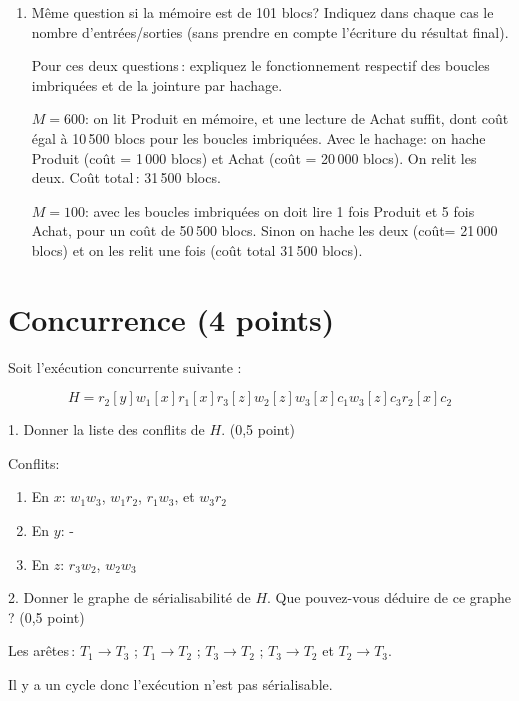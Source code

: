 \begin{enumerate}
    
   \item Même question si la mémoire est
        de 101 blocs? Indiquez dans chaque cas le nombre
    d'entrées/sorties (sans prendre en compte l'écriture du résultat final).

    Pour ces deux questions\,: expliquez le fonctionnement respectif 
    des boucles imbriquées et de la jointure par hachage.
    
\begin{solution}
$M=600$: on lit Produit en mémoire, et une lecture de Achat suffit,
dont coût égal à 10\,500 blocs pour les boucles imbriquées.
Avec le hachage: on hache Produit (coût = 1\,000 blocs)
et Achat (coût = 20\,000 blocs). On relit les deux. Coût
total\,: 31\,500 blocs.

$M=100$: avec les boucles imbriquées on doit lire 1 fois Produit et
5 fois Achat, pour un coût de 50\,500 blocs. Sinon on hache les
deux (coût= 21\,000 blocs) et on les relit une fois (coût total
31\,500 blocs). 
\end{solution}
\end{enumerate}


\section{Concurrence (4 points)}

Soit l'exécution concurrente suivante :

$$H = r_2[y] w_1[x] r_1[x] r_3[z] w_2[z] w_3[x] c_1 w_3[z] c_3 r_2[x] c_2$$

1. Donner la liste des conflits de $H$. (0,5 point)

\begin{solution}

Conflits:
\begin{enumerate}
 \item En $x$: $w_1w_3$, $w_1r_2$, $r_1w_3$, et $w_3r_2$
  \item En $y$: -
  \item En $z$: $r_3w_2$, $w_2w_3$
\end{enumerate}

\end{solution}

2. Donner le graphe de sérialisabilité de $H$. Que pouvez-vous déduire de ce graphe ? (0,5 point)

\begin{solution}
Les arêtes\,: $T_1 \to T_3$ ; $T_1 \to T_2$ ; $T_3 \to T_2$ ; $T_3 \to T_2$  et  $T_2 \to T_3$.

Il y a un cycle donc l'exécution n'est pas sérialisable.
\end{solution}

